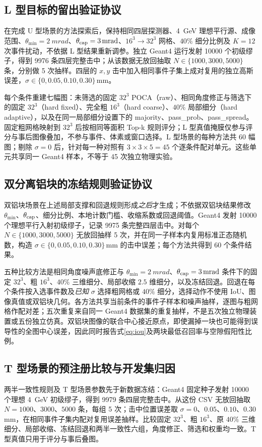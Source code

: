 \documentclass[UTF8,fontset=none,zihao=-4,a4paper]{ctexart}
\begin{document}
\subsection{L 型目标的留出验证协议}
在完成 U 型场景的方法探索后，保持相同四层探测器、\SI{4}{GeV} 理想平行源、成像范围、$\theta_{\min}=\SI{2}{mrad}$、$\theta_{\rm cap}=\SI{3}{mrad}$、$16^3\rightarrow32^3$ 网格、$40\%$ 细分比例及 $K=12$ 次事件扰动，不依据 L 型结果重新调参。独立 Geant4 运行发射 \num{10000} 个初级缪子，得到 \num{9976} 条四层完整击中；从该数据无放回抽取 $N\in\{1000,3000,5000\}$ 条，分别做 5 次抽样。四层的 $x,y$ 击中加入相同事件子集上成对复用的独立高斯误差，$\sigma\in\{0,0.05,0.10,0.30\}$\,mm。

每个条件重建七幅图：未筛选的固定 $32^3$ POCA（raw）、相同角度修正与筛选下的固定 $32^3$（hard fixed）、完全粗 $16^3$（hard coarse）、$40\%$ 局部细分（hard adaptive），以及在同一局部细分设置下的 majority、pass\_prob、pass\_spread。固定粗网格映射到 $32^3$ 后按相同等面积 Top-k 规则评分；L 型真值掩膜仅参与评分与事后图像叠加，不参与事件、体素或窗口选择。L 型场景的每种方法共 60 幅图；剔除 $\sigma=0$ 后，针对每一种对照有 $3\times3\times5=45$ 个逐条件配对单元。这些单元共享同一 Geant4 样本，不等于 45 次独立物理实验。

\subsection{双分离铝块的冻结规则验证协议}
双铝块场景在上述局部支撑和回退规则形成\emph{之后}才生成；不依据双铝块结果修改 $\theta_{\min}$、$\theta_{\rm cap}$、细分比例、本地计数门槛、收缩系数或回退阈值。Geant4 发射 \num{10000} 个理想平行入射初级缪子，记录 \num{9975} 条完整四层击中。对每个 $N\in\{1000,3000,5000\}$ 无放回抽样 5 次，并在同一子样本内复用标准正态随机数，构造 $\sigma\in\{0,0.05,0.10,0.30\}$\,mm 的击中误差；每个方法共得到 60 个条件结果。

五种比较方法是相同角度噪声底修正与 $\theta_{\min}=\SI{2}{mrad}$、$\theta_{\rm cap}=\SI{3}{mrad}$ 条件下的固定 $32^3$、粗 $16^3$、$40\%$ 三维细分、局部收缩 $2.5$ 维细分，以及冻结回退。回退在每个条件按入选事件数及\emph{已知} $\sigma$ 选择粗网格或 $40\%$ 细分，选择动作不使用 IoU、图像真值或双铝块几何。各方法共享当前条件的事件子样本和噪声抽样，逐图与粗网格作配对差；五次重复来自同一 Geant4 数据集的重复抽样，不是五次独立物理装置或五份独立仿真。双铝块图像的联合中心接近原点，即使漏掉一块也可能得到误导性的全图中心误差，因此同时报告式\eqref{eq:iou}及两块最低召回率与空隙假阳性比例。

\subsection{T 型场景的预注册比较与开发集归因}
两半一致性规则及 T 型场景参数先于新数据冻结：Geant4 固定种子发射 \num{10000} 个理想 \SI{4}{GeV} 初级缪子，得到 \num{9979} 条四层完整击中。从这份 CSV 无放回抽取 $N=1000$、$3000$、$5000$ 条，每组 5 次；击中位置误差取 $\sigma=0$、$0.05$、$0.10$、$0.30$\,mm，在相同事件子集内配对复用误差抽样。比较固定 $32^3$、粗 $16^3$、原 $40\%$ 三维细分、局部收缩、冻结回退和两半一致性六组，角度修正、筛选和权重均一致。T 型真值只用于评分与事后叠图。
\end{document}
